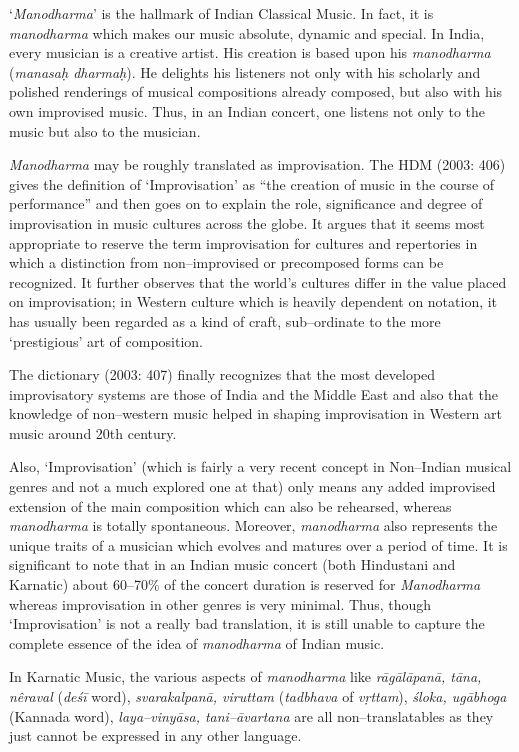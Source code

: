 ‘\textit{Manodharma}’ is the hallmark of Indian Classical Music. In fact, it is \textit{manodharma} which makes our music absolute, dynamic and special. In India, every musician is a creative artist. His creation is based upon his \textit{manodharma} (\textit{manasaḥ dharmaḥ}). He delights his listeners not only with his scholarly and polished renderings of musical compositions already composed, but also with his own improvised music. Thus, in an Indian concert, one listens not only to the music but also to the musician.

\newpage

\textit{Manodharma} may be roughly translated as improvisation. The HDM (2003: 406) gives the definition of ‘Improvisation’ as “the creation of music in the course of performance” and then goes on to explain the role, significance and degree of improvisation in music cultures across the globe. It argues that it seems most appropriate to reserve the term improvisation for cultures and repertories in which a distinction from non–improvised or precomposed forms can be recognized. It further observes that the world’s cultures differ in the value placed on improvisation; in Western culture which is heavily dependent on notation, it has usually been regarded as a kind of craft, sub–ordinate to the more ‘prestigious’ art of composition.

The dictionary (2003: 407) finally recognizes that the most developed improvisatory systems are those of India and the Middle East and also that the knowledge of non–western music helped in shaping improvisation in Western art music around 20th century.

Also, ‘Improvisation’ (which is fairly a very recent concept in Non–Indian musical genres and not a much explored one at that) only means any added improvised extension of the main composition which can also be rehearsed, whereas \textit{manodharma} is totally spontaneous. Moreover, \textit{manodharma} also represents the unique traits of a musician which evolves and matures over a period of time. It is significant to note that in an Indian music concert (both Hindustani and Karnatic) about 60–70\% of the concert duration is reserved for \textit{Manodharma} whereas improvisation in other genres is very minimal. Thus, though ‘Improvisation’ is not a really bad translation, it is still unable to capture the complete essence of the idea of \textit{manodharma} of Indian music.

In Karnatic Music, the various aspects of \textit{manodharma} like \textit{rāgālāpanā, tāna, nêraval} (\textit{deśī} word), \textit{svarakalpanā, viruttam} (\textit{tadbhava} of \textit{vṛttam}), \textit{śloka, ugābhoga} (Kannada word), \textit{laya–vinyāsa, tani–āvartana} are all non–translatables as they just cannot be expressed in any other language.


